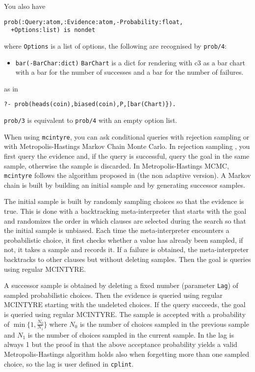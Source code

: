 You also have
\begin{verbatim}
prob(:Query:atom,:Evidence:atom,-Probability:float,
  +Options:list) is nondet
\end{verbatim}
where \verb|Options| is a list of options, the following are recognised by \verb|prob/4|:
\begin{itemize}
\item \verb|bar(-BarChar:dict)|
\verb|BarChart| is a dict for rendering with c3 as a bar chart with
a bar for the number of successes and a bar for the number
of failures.
\end{itemize}
as in
\begin{verbatim}
?- prob(heads(coin),biased(coin),P,[bar(Chart)}).
\end{verbatim}
\verb|prob/3| is equivalent to \verb|prob/4| with an empty option list. 

When using \verb|mcintyre|, you can ask conditional queries with rejection sampling or with Metropolis-Hastings Markov Chain Monte Carlo.
In rejection sampling \cite{von195113}, you first query the evidence and, if the query is successful, query the goal in the same sample, otherwise
the sample is discarded.
In Metropolis-Hastings MCMC, \verb|mcintyre| follows the algorithm proposed in \cite{nampally2014adaptive} (the non adaptive version).
A Markov chain is built by building an initial sample and by generating successor samples.

The initial sample is built by  randomly sampling choices so that the evidence is true. This is done with
a backtracking meta-interpreter that starts with the goal and
randomizes the order in which clauses are selected during the search so that the initial sample is unbiased. Each time the meta-interpreter encounters
a probabilistic choice, it first checks whether a
value has already been sampled, if not, it takes
a sample and records it. If a failure is obtained,
the meta-interpreter backtracks to other clauses but
without deleting samples. Then the goal is queries using
regular MCINTYRE.

A successor sample is obtained by deleting a
fixed number (parameter \verb|Lag|) of sampled probabilistic choices. Then the
evidence is queried using regular MCINTYRE starting with the undeleted choices.
If the query succeeds, the goal is queried using regular MCINTYRE.
The sample is accepted with a probability of $\min\{1,\frac{N_0}{N_1}\}$ where $N_0$ is the number of choices sampled
in the previous sample and $N_1$ is the number of choices sampled in the current sample.
In \cite{nampally2014adaptive} the lag is always 1 but the proof in \cite{nampally2014adaptive} that the above acceptance
probability yields a valid
Metropolis-Hastings algorithm holds also when forgetting more than one
sampled choice, so the lag is
user defined in \verb|cplint|.

